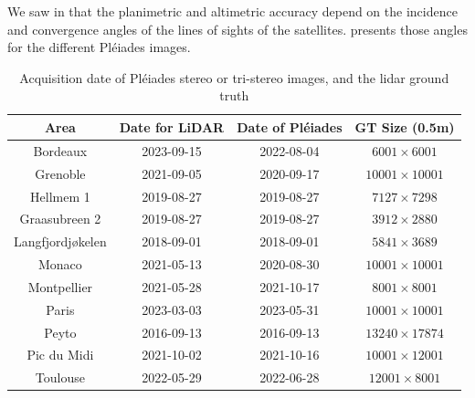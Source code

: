 We saw in  that the planimetric and altimetric accuracy depend on the incidence and convergence angles of the lines of sights of the satellites.  presents those angles for the different Pléiades images.

\begin{table}[ht]
    \centering
    \begin{tabular}{|c||c|c|c|}
    \hline
        Area & Date for LiDAR & Date of Pléiades &  GT Size (0.5m)\\
        \hline\hline
        Bordeaux & 2023-09-15 & 2022-08-04 & $6001\times 6001$\\\hline
        Grenoble & 2021-09-05 & 2020-09-17 & $10 001\times 10 001$ \\\hline
        Hellmem 1 & 2019-08-27 & 2019-08-27 & $7127\times 7298$ \\\hline
        Graasubreen 2 & 2019-08-27 & 2019-08-27 & $3912\times2880$ \\\hline
        Langfjordjøkelen & 2018-09-01 & 2018-09-01 & $5841\times 3689$\\\hline
        Monaco & 2021-05-13 & 2020-08-30 & $10 001\times 10 001$\\\hline
        Montpellier & 2021-05-28 & 2021-10-17 & $8001\times 8001$\\\hline
        Paris & 2023-03-03 & 2023-05-31 & $10 001\times 10 001$\\\hline
        Peyto & 2016-09-13 & 2016-09-13 & $13240\times 17874$\\\hline
        Pic du Midi & 2021-10-02 & 2021-10-16 & $10001 \times 12001$ \\\hline
        Toulouse & 2022-05-29 & 2022-06-28 & $12001\times 8001$\\\hline
    \end{tabular}
    \caption{Acquisition date of Pléiades stereo or tri-stereo images, and the \acrshort{lidar} ground truth}
    \label{tab:dates_pleiades_lidar_hd}
\end{table}


